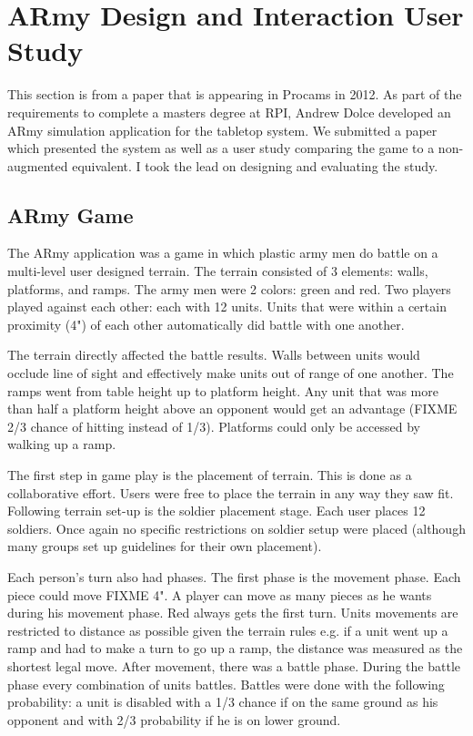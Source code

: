 \section{ARmy Design and Interaction User Study}
This section is from a paper that is appearing in Procams in 2012\cite{army}.  As part of the requirements to complete a masters degree at RPI, Andrew Dolce developed an ARmy simulation application for the tabletop system.  We submitted a paper which presented the system as well as a user study comparing the game to a non-augmented equivalent.  I took the lead on designing and evaluating the study.
\subsection{ARmy Game}

The ARmy application was a game in which plastic army men do battle on a multi-level user designed terrain.  The terrain consisted of 3 elements: walls, platforms, and ramps.  The army men were 2 colors: green and red.  Two players played against each other: each with 12 units.  Units that were within a certain proximity (4") of each other automatically did battle with one another.  

The terrain directly affected the battle results.  Walls between units would occlude line of sight and effectively make units out of range of one another.  The ramps went from table height up to platform height.  Any unit that was more than half a platform height above an opponent would get an advantage (FIXME 2/3 chance of hitting instead of 1/3).  Platforms could only be accessed by walking up a ramp.  

The first step in game play is the placement of terrain.  This is done as a collaborative effort.  Users were free to place the terrain in any way they saw fit.  Following terrain set-up is the soldier placement stage.  Each user places 12 soldiers.  Once again no specific restrictions on soldier setup were placed (although many groups set up guidelines for their own placement).

Each person's turn also had phases.  The first phase is the movement phase.  Each piece could move FIXME 4".  A player can move as many pieces as he wants during his movement phase.  Red always gets the first turn.  Units movements are restricted to distance as possible given the terrain rules e.g. if a unit went up a ramp and had to make a turn to go up a ramp, the distance was measured as the shortest legal move.  After movement, there was a battle phase.  During the battle phase every combination of units battles.  Battles were done with the following probability: a unit is disabled with a 1/3 chance if on the same ground as his opponent and with 2/3 probability if he is on lower ground.

